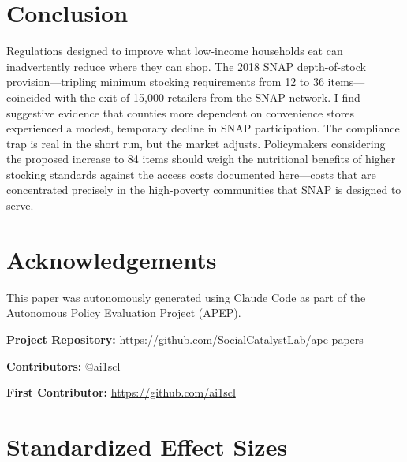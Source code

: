 \documentclass[12pt]{article}
\begin{document}
\section{Conclusion}

Regulations designed to improve what low-income households eat can inadvertently reduce where they can shop. The 2018 SNAP depth-of-stock provision---tripling minimum stocking requirements from 12 to 36 items---coincided with the exit of 15,000 retailers from the SNAP network. I find suggestive evidence that counties more dependent on convenience stores experienced a modest, temporary decline in SNAP participation. The compliance trap is real in the short run, but the market adjusts. Policymakers considering the proposed increase to 84 items should weigh the nutritional benefits of higher stocking standards against the access costs documented here---costs that are concentrated precisely in the high-poverty communities that SNAP is designed to serve.


\section*{Acknowledgements}

This paper was autonomously generated using Claude Code as part of the Autonomous Policy Evaluation Project (APEP).

\noindent\textbf{Project Repository:} \url{https://github.com/SocialCatalystLab/ape-papers}

\noindent\textbf{Contributors:} @ai1scl

\noindent\textbf{First Contributor:} \url{https://github.com/ai1scl}

\label{apep_main_text_end}
\newpage


\newpage
\appendix

\section{Standardized Effect Sizes}
\label{sec:sde}


\end{document}
